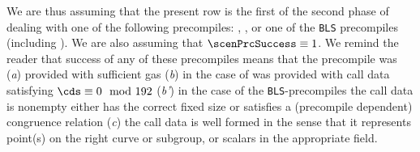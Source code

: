 \begin{center}
\end{center}
We are thus assuming that the present row is the first of the second phase of dealing with one of the following precompiles:
\instEcadd{}, \instEcmul{}, \instEcpairing{} or one of the
\texttt{BLS} precompiles (including \instPointEvaluation{}).
We are also assuming that $\scenPrcSuccess \equiv 1$.
We remind the reader that success of any of these precompiles means that the precompile was
(\emph{a}) provided with sufficient gas
(\emph{b}) in the case of \instEcpairing{} was provided with call data satisfying $\cds \equiv 0 \mod 192$
(\emph{b'}) in the case of the \texttt{BLS}-precompiles the call data is nonempty either has the correct fixed size or satisfies a (precompile dependent) congruence relation
(\emph{c}) the call data is well formed in the sense that it represents point(s) on the right curve or subgroup, or scalars in the appropriate field.
